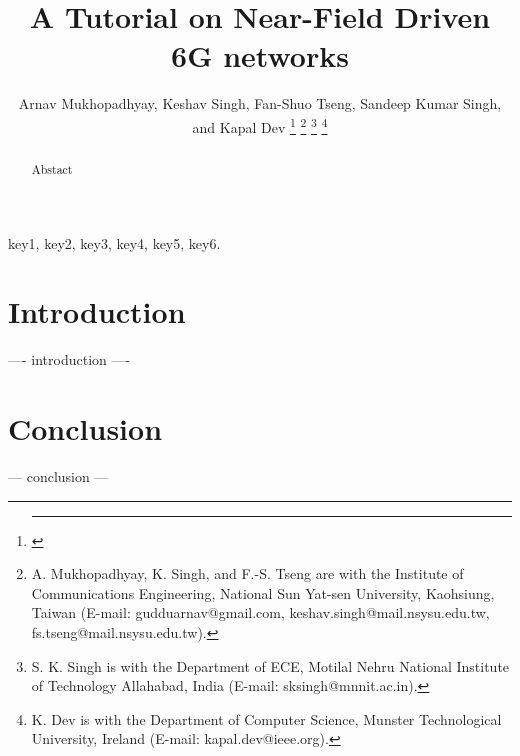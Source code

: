 \documentclass[journal]{IEEEtran}
\begin{document}
\title{A Tutorial on Near-Field Driven 6G networks}
\author{Arnav Mukhopadhyay, Keshav Singh,
Fan-Shuo Tseng, Sandeep Kumar Singh, and Kapal Dev
\thanks{\hrule}
\thanks{A. Mukhopadhyay, K. Singh, and
F.-S. Tseng are with the Institute of Communications Engineering, National Sun Yat-sen University, Kaohsiung, Taiwan (E-mail: gudduarnav@gmail.com, 
keshav.singh@mail.nsysu.edu.tw, fs.tseng@mail.nsysu.edu.tw).}
\thanks{S. K. Singh is with the Department of ECE, Motilal Nehru National Institute of Technology Allahabad, India (E-mail: sksingh@mnnit.ac.in).}
\thanks{K. Dev is with the Department of Computer Science, Munster Technological University, Ireland (E-mail: kapal.dev@ieee.org).}

}

\maketitle

\begin{abstract}
Abstact
\end{abstract}

\begin{IEEEkeywords}
key1, key2, key3, key4, key5, key6.
\end{IEEEkeywords}



\section{Introduction}
 ---- introduction ----
 
\section{Conclusion}
--- conclusion ---

% 
 

\end{document}
